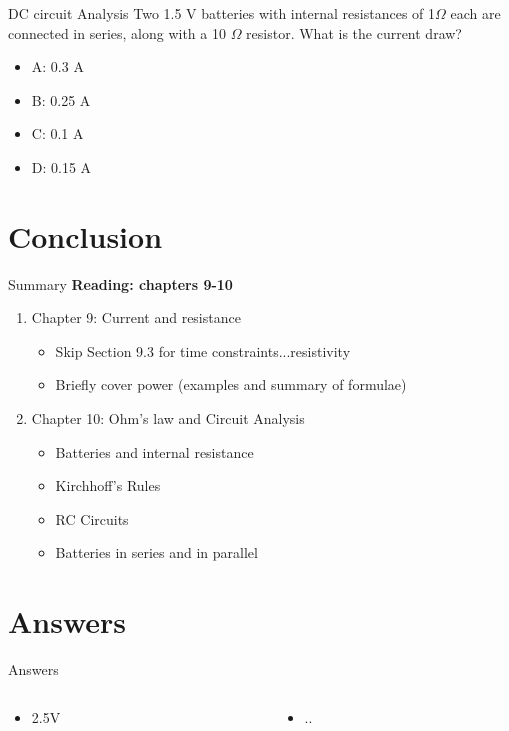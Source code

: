 \documentclass{beamer}
\begin{document}
\begin{frame}{DC circuit Analysis}
Two 1.5 V batteries with internal resistances of 1$\Omega$ each are connected in series, along with a 10 $\Omega$ resistor.  What is the current draw?
\begin{itemize}
\item A: 0.3 A
\item B: 0.25 A
\item C: 0.1 A
\item D: 0.15 A
\end{itemize}
\end{frame}

\section{Conclusion}

\begin{frame}{Summary}
\textbf{Reading: chapters 9-10}
\begin{enumerate}
\item Chapter 9: Current and resistance
\begin{itemize}
\item Skip Section 9.3 for time constraints...resistivity
\item Briefly cover power (examples and summary of formulae)
\end{itemize}
\item Chapter 10: Ohm's law and Circuit Analysis
\begin{itemize}
\item Batteries and internal resistance
\item Kirchhoff's Rules
\item RC Circuits
\item Batteries in series and in parallel
\end{itemize}
\end{enumerate}
\end{frame}

\section{Answers}

\begin{frame}{Answers}
\small
\begin{columns}[T]
\begin{column}{0.5\textwidth}
\begin{itemize}
\item 2.5V
\end{itemize}
\end{column}
\begin{column}{0.5\textwidth}
\begin{itemize}
\item ..
\end{itemize}
\end{column}
\end{columns}
\end{frame}
\end{document}
